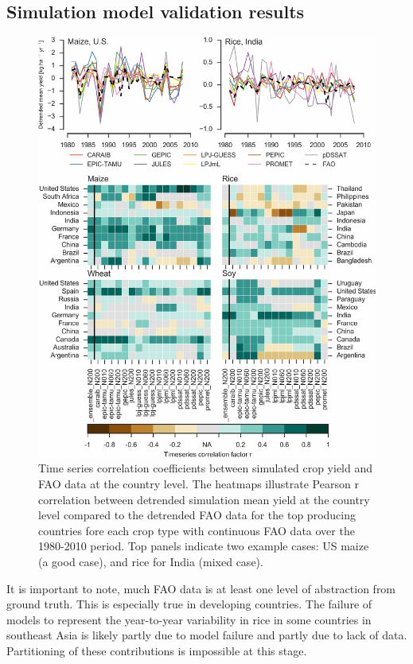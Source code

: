 \documentclass[preprint, 5p, times, twocolumn]{elsarticle}
\begin{document}
\subsection{Simulation model validation results}
\begin{figure}[!htb]
    \centering
    \includegraphics[width=0.8\linewidth]{Phase_II_Validation.pdf}
    \caption{Time series correlation coefficients between simulated crop yield and FAO data at the country level. The heatmaps illustrate Pearson r correlation between detrended simulation mean yield at the country level compared to the detrended FAO data for the top producing countries fore each crop type with continuous FAO data over the 1980-2010 period. Top panels indicate two example cases: US maize (a good case), and rice for India (mixed case). }
    \label{fig:simulation_val}
\end{figure}

It is important to note, much FAO data is at least one level of abstraction from ground truth. This is especially true in developing countries. The failure of models to represent the year-to-year variability in rice in some countries in southeast Asia is likely partly due to model failure and partly due to lack of data. Partitioning of these contributions is impossible at this stage.
\end{document}
